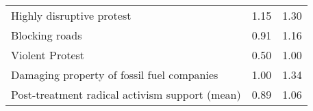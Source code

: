 \documentclass{article}
\begin{document}
\begin{table}[!h]
\begin{tabular}{lll}
\cline{1-3}
\multicolumn{1}{|l}{Highly disruptive protest} &
  \multicolumn{1}{|l}{1.15} &
  \multicolumn{1}{|l|}{1.30} \\
\cline{1-3}
\multicolumn{1}{|l}{Blocking roads} &
  \multicolumn{1}{|l}{0.91} &
  \multicolumn{1}{|l|}{1.16} \\
\cline{1-3}
\multicolumn{1}{|l}{Violent Protest} &
  \multicolumn{1}{|l}{0.50} &
  \multicolumn{1}{|l|}{1.00} \\
\cline{1-3}
\multicolumn{1}{|l}{Damaging property of fossil fuel companies} &
  \multicolumn{1}{|l}{1.00} &
  \multicolumn{1}{|l|}{1.34} \\
\cline{1-3}
\multicolumn{1}{|l}{Post-treatment radical activism support (mean)} &
  \multicolumn{1}{|l}{0.89} &
  \multicolumn{1}{|l|}{1.06} \\
\cline{1-3}
\end{tabular}
\end{table}
\end{document}
